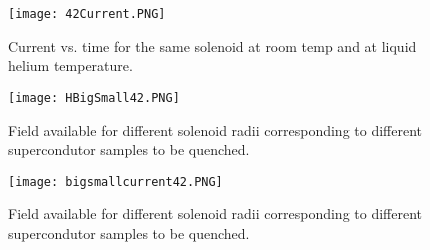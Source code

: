\documentclass[prb,preprint]{revtex4-1}
\begin{document}
\begin{figure}[page]
\centering
\texttt{[image: 42Current.PNG]}
\caption{Current vs. time for the same solenoid at room temp and at liquid helium temperature.}
\label{sunsets}
\end{figure}
\begin{figure}[h!]
\centering
\texttt{[image: HBigSmall42.PNG]}
\caption{Field available for different solenoid radii corresponding to different supercondutor samples to be quenched.}
\label{sunsets}
\end{figure}
\begin{figure}[h!]
\centering
\texttt{[image: bigsmallcurrent42.PNG]}
\caption{Field available for different solenoid radii corresponding to different supercondutor samples to be quenched.}
\label{sunsets}
\end{figure}
\end{document}
